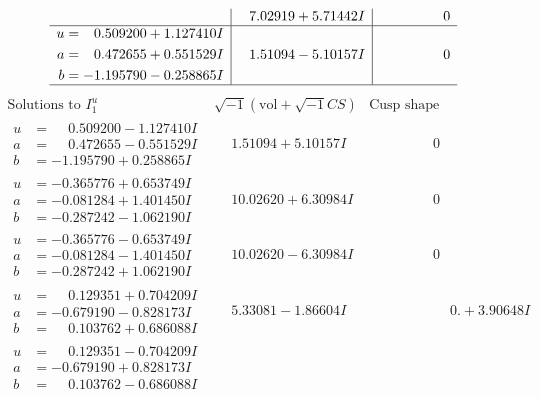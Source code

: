 \documentclass[1p]{elsarticle_modified}
\theoremstyle{definition}
\newcommand{\I}{\sqrt{-1}}
\begin{document}
$$\begin{array}{c|c|c}
 & \phantom{-}7.02919 + 5.71442 I & \phantom{-0.000000 } 0 \\ \hline\begin{aligned}
u &= \phantom{-}0.509200 + 1.127410 I \\
a &= \phantom{-}0.472655 + 0.551529 I \\
b &= -1.195790 - 0.258865 I\end{aligned}
 & \phantom{-}1.51094 - 5.10157 I & \phantom{-0.000000 } 0\\
 \hline 
 \end{array}$$\newpage$$\begin{array}{c|c|c}  
\text{Solutions to }I^u_{1}& \I (\text{vol} + \sqrt{-1}CS) & \text{Cusp shape}\\
 \hline 
\begin{aligned}
u &= \phantom{-}0.509200 - 1.127410 I \\
a &= \phantom{-}0.472655 - 0.551529 I \\
b &= -1.195790 + 0.258865 I\end{aligned}
 & \phantom{-}1.51094 + 5.10157 I & \phantom{-0.000000 } 0 \\ \hline\begin{aligned}
u &= -0.365776 + 0.653749 I \\
a &= -0.081284 + 1.401450 I \\
b &= -0.287242 - 1.062190 I\end{aligned}
 & \phantom{-}10.02620 + 6.30984 I & \phantom{-0.000000 } 0 \\ \hline\begin{aligned}
u &= -0.365776 - 0.653749 I \\
a &= -0.081284 - 1.401450 I \\
b &= -0.287242 + 1.062190 I\end{aligned}
 & \phantom{-}10.02620 - 6.30984 I & \phantom{-0.000000 } 0 \\ \hline\begin{aligned}
u &= \phantom{-}0.129351 + 0.704209 I \\
a &= -0.679190 - 0.828173 I \\
b &= \phantom{-}0.103762 + 0.686088 I\end{aligned}
 & \phantom{-}5.33081 - 1.86604 I & \phantom{-0.000000 -}0. + 3.90648 I \\ \hline\begin{aligned}
u &= \phantom{-}0.129351 - 0.704209 I \\
a &= -0.679190 + 0.828173 I \\
b &= \phantom{-}0.103762 - 0.686088 I\end{aligned}

\end{array}$$
\end{document}
